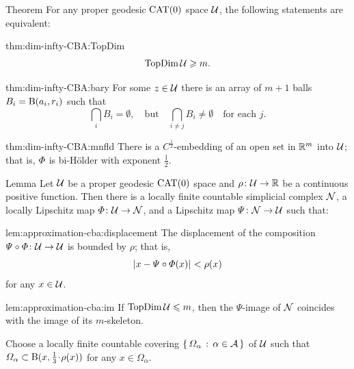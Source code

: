 \begin{thm}{Theorem}\label{thm:dim-infty-CBA}
For any proper geodesic $\mathrm{CAT}(0)$ space $\mathcal{U}$, the following statements are equivalent:

\begin{subthm}{thm:dim-infty-CBA:TopDim}
\[\mathop{\rm TopDim}\nolimits \mathcal{U}\geqslant m.\]
\end{subthm}

\begin{subthm}{thm:dim-infty-CBA:bary} 
For some $z\in \mathcal{U}$ there is an array of $m+1$ balls $B_i\z=\oBall(a_i,r_i)$
such that 
\[\bigcap_i B_i=\emptyset,
\quad\text{but}\quad
\bigcap_{i\ne j} B_i\ne \emptyset
\quad \text{for each $j$}.\]

\end{subthm}


\begin{subthm}{thm:dim-infty-CBA:mnfld} 
There is a $C^{\frac{1}{2}}$-embedding of an open set in $\mathbb{R}^m$ into $\mathcal{U}$;
that is, $\varPhi$ is bi-Hölder with exponent $\tfrac{1}{2}$.
\end{subthm}

\end{thm}


\begin{thm}{Lemma}\label{lem:approximation-cba}
Let $\mathcal{U}$ be a proper geodesic $\mathrm{CAT}(0)$ space
and $\rho\:\spc{U}\z\to\RR$ be a continuous positive function.
Then there is a locally finite countable simplicial complex $\mathcal{N}$,
a locally Lipschitz map $\map\:\spc{U}\z\to \spc{N}$, 
and a Lipschitz map $\varPsi\colon\mathcal{N}\to\mathcal{U}$ such that:

\begin{subthm}{lem:approximation-cba:displacement}
The displacement of the composition $\varPsi\circ\varPhi\colon\mathcal{U}\to\mathcal{U}$ is bounded by $\rho$;
that is,
\[\dist{x}{\Psi\circ\map(x)}{}<\rho(x)\] 
for any $x\in\mathcal{U}$.
\end{subthm}

\begin{subthm}{lem:approximation-cba:im}
If $\mathop{\rm TopDim}\nolimits\mathcal{U}\leqslant m$, 
then the $\Psi$-image of $\mathcal{N}$ 
coincides with the image of its $m$-skeleton.
\end{subthm}

\end{thm}

Choose a locally finite countable covering $\left\{\,{\varOmega_\alpha}\,:\,{\alpha\in\mathcal{A}}\,\right\}$ of $\mathcal{U}$ such that $\Omega_\alpha\subset \oBall(x,\tfrac{1}{3}\cdot\rho(x))$ for any $x\in \Omega_\alpha$. 

